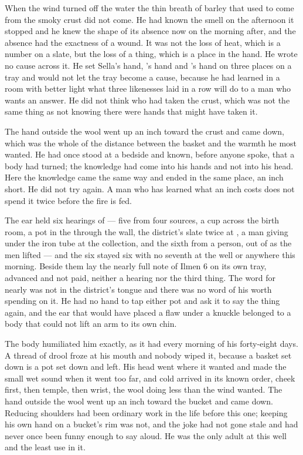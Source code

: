 When the wind turned off the water the thin breath of barley that used to come from the smoky crust did not come. He had known the smell on the afternoon it stopped and he knew the shape of its absence now on the morning after, and the absence had the exactness of a wound. It was not the loss of heat, which is a number on a slate, but the loss of a thing, which is a place in the hand. He wrote no cause across it. He set Sella's hand, 's hand and 's hand on three places on a tray and would not let the tray become a cause, because he had learned in a room with better light what three likenesses laid in a row will do to a man who wants an answer. He did not think who had taken the crust, which was not the same thing as not knowing there were hands that might have taken it.

The hand outside the wool went up an inch toward the crust and came down, which was the whole of the distance between the basket and the warmth he most wanted. He had once stood at a bedside and known, before anyone spoke, that a body had turned; the knowledge had come into his hands and not into his head. Here the knowledge came the same way and ended in the same place, an inch short. He did not try again. A man who has learned what an inch costs does not spend it twice before the fire is fed.

The ear held six hearings of  --- five from four sources, a cup across the birth room, a pot in the  through the wall, the district's slate twice at , a man giving under the iron tube at the collection, and the sixth from a person, out of  as the men lifted --- and the six stayed six with no seventh at the well or anywhere this morning. Beside them lay the nearly full note of Ilmen 6 on its own tray, advanced and not paid, neither a hearing nor the third thing. The word for nearly was not in the district's tongue and there was no word of his worth spending on it. He had no hand to tap either pot and ask it to say the thing again, and the ear that would have placed a flaw under a knuckle belonged to a body that could not lift an arm to its own chin.

The body humiliated him exactly, as it had every morning of his forty-eight days. A thread of drool froze at his mouth and nobody wiped it, because a basket set down is a pot set down and left. His head went where it wanted and made the small wet sound when it went too far, and cold arrived in its known order, cheek first, then temple, then wrist, the wool doing less than the wind wanted. The hand outside the wool went up an inch toward the bucket and came down. Reducing shoulders had been ordinary work in the life before this one; keeping his own hand on a bucket's rim was not, and the joke had not gone stale and had never once been funny enough to say aloud. He was the only adult at this well and the least use in it.

